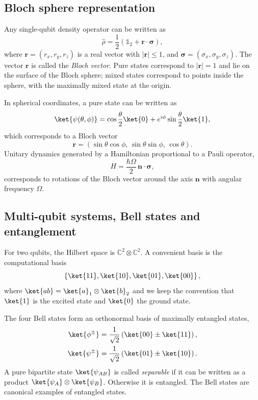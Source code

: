 \subsection{Bloch sphere representation}

Any single-qubit density operator can be written as
\begin{equation}
	\hat{\rho} = \frac{1}{2}\left(\mathbb{1}_2 + \mathbf{r} \cdot \boldsymbol{\sigma}\right),
\end{equation}
where $\mathbf{r} = (r_x,r_y,r_z)$ is a real vector with $|\mathbf{r}| \leq 1$, and $\boldsymbol{\sigma} = (\sigma_x,\sigma_y,\sigma_z)$. 
The vector $\mathbf{r}$ is called the \emph{Bloch vector}. 
Pure states correspond to $|\mathbf{r}| = 1$ and lie on the surface of the Bloch sphere; mixed states correspond to points inside the sphere, with the maximally mixed state at the origin.

In spherical coordinates, a pure state can be written as
\begin{equation}
	\ket{\psi(\theta,\phi)} = \cos\frac{\theta}{2} \ket{0}
	+ e^{i\phi} \sin\frac{\theta}{2} \ket{1},
\end{equation}
which corresponds to a Bloch vector
\begin{equation}
	\mathbf{r} = 
	(\sin\theta \cos\phi, \, \sin\theta \sin\phi, \, \cos\theta).
\end{equation}
Unitary dynamics generated by a Hamiltonian proportional to a Pauli operator,
\begin{equation}
	H = \frac{\hbar \Omega}{2} \, \mathbf{n} \cdot \boldsymbol{\sigma},
\end{equation}
corresponds to rotations of the Bloch vector around the axis $\mathbf{n}$ with angular frequency $\Omega$.

\subsection{Multi-qubit systems, Bell states and entanglement}

For two qubits, the Hilbert space is $\mathbb{C}^2 \otimes \mathbb{C}^2$. 
A convenient basis is the computational basis
\begin{equation}
	\left\{\ket{11}, \ket{10}, \ket{01}, \ket{00} \right\},
\end{equation}
where $\ket{ab} = \ket{a}_1 \otimes \ket{b}_2$ and we keep the convention that $\ket{1}$ is the excited state and $\ket{0}$ the ground state.

The four Bell states form an orthonormal basis of maximally entangled states,
\begin{align}
	\ket{\phi^\pm} &= \frac{1}{\sqrt{2}}\left(\ket{00} \pm \ket{11}\right),
	\\
	\ket{\psi^\pm} &= \frac{1}{\sqrt{2}}\left(\ket{01} \pm \ket{10}\right).
\end{align}
A pure bipartite state $\ket{\psi_{AB}}$ is called \emph{separable} if it can be written as a product $\ket{\psi_A} \otimes \ket{\psi_B}$. 
Otherwise it is entangled. 
The Bell states are canonical examples of entangled states.


